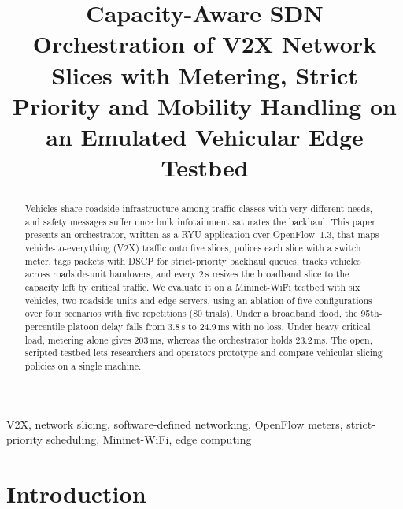 \documentclass[conference]{IEEEtran}
\begin{document}
\title{Capacity-Aware SDN Orchestration of V2X Network Slices with Metering, Strict Priority and Mobility Handling on an Emulated Vehicular Edge Testbed}

\author{
}

\maketitle

\begin{abstract}
Vehicles share roadside infrastructure among traffic classes with very different needs, and safety messages suffer once bulk infotainment saturates the backhaul. This paper presents an orchestrator, written as a RYU application over OpenFlow~1.3, that maps vehicle-to-everything (V2X) traffic onto five slices, polices each slice with a switch meter, tags packets with DSCP for strict-priority backhaul queues, tracks vehicles across roadside-unit handovers, and every 2\,s resizes the broadband slice to the capacity left by critical traffic. We evaluate it on a Mininet-WiFi testbed with six vehicles, two roadside units and edge servers, using an ablation of five configurations over four scenarios with five repetitions (80 trials). Under a broadband flood, the 95th-percentile platoon delay falls from 3.8\,s to 24.9\,ms with no loss. Under heavy critical load, metering alone gives 203\,ms, whereas the orchestrator holds 23.2\,ms. The open, scripted testbed lets researchers and operators prototype and compare vehicular slicing policies on a single machine.
\end{abstract}

\begin{IEEEkeywords}
V2X, network slicing, software-defined networking, OpenFlow meters, strict-priority scheduling, Mininet-WiFi, edge computing
\end{IEEEkeywords}

\section{Introduction}
\end{document}
